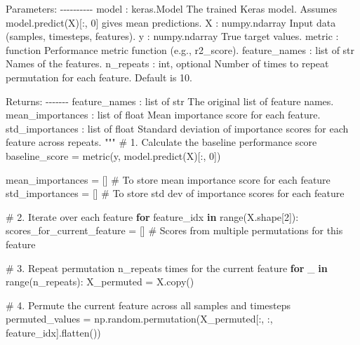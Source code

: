 \documentclass[
  letterpaper,
  DIV=11,
  numbers=noendperiod]{scrreprt}
\newenvironment{Shaded}{\begin{snugshade}}{\end{snugshade}}
\newcommand{\BuiltInTok}[1]{\textcolor[rgb]{0.00,0.23,0.31}{#1}}
\newcommand{\CommentTok}[1]{\textcolor[rgb]{0.37,0.37,0.37}{#1}}
\newcommand{\ControlFlowTok}[1]{\textcolor[rgb]{0.00,0.23,0.31}{\textbf{#1}}}
\newcommand{\DecValTok}[1]{\textcolor[rgb]{0.68,0.00,0.00}{#1}}
\newcommand{\KeywordTok}[1]{\textcolor[rgb]{0.00,0.23,0.31}{\textbf{#1}}}
\newcommand{\NormalTok}[1]{\textcolor[rgb]{0.00,0.23,0.31}{#1}}
\newcommand{\OperatorTok}[1]{\textcolor[rgb]{0.37,0.37,0.37}{#1}}
\begin{document}
\begin{Shaded}
\begin{Highlighting}[]
\CommentTok{    Parameters:}
\CommentTok{    {-}{-}{-}{-}{-}{-}{-}{-}{-}{-}}
\CommentTok{    model : keras.Model}
\CommentTok{        The trained Keras model. Assumes model.predict(X)[:, 0] gives mean predictions.}
\CommentTok{    X : numpy.ndarray}
\CommentTok{        Input data (samples, timesteps, features).}
\CommentTok{    y : numpy.ndarray}
\CommentTok{        True target values.}
\CommentTok{    metric : function}
\CommentTok{        Performance metric function (e.g., r2\_score).}
\CommentTok{    feature\_names : list of str}
\CommentTok{        Names of the features.}
\CommentTok{    n\_repeats : int, optional}
\CommentTok{        Number of times to repeat permutation for each feature. Default is 10.}

\CommentTok{    Returns:}
\CommentTok{    {-}{-}{-}{-}{-}{-}{-}}
\CommentTok{    feature\_names : list of str}
\CommentTok{        The original list of feature names.}
\CommentTok{    mean\_importances : list of float}
\CommentTok{        Mean importance score for each feature.}
\CommentTok{    std\_importances : list of float}
\CommentTok{        Standard deviation of importance scores for each feature across repeats.}
\CommentTok{    """}
    \CommentTok{\# 1. Calculate the baseline performance score}
\NormalTok{    baseline\_score }\OperatorTok{=}\NormalTok{ metric(y, model.predict(X)[:, }\DecValTok{0}\NormalTok{])}

\NormalTok{    mean\_importances }\OperatorTok{=}\NormalTok{ [] }\CommentTok{\# To store mean importance score for each feature}
\NormalTok{    std\_importances }\OperatorTok{=}\NormalTok{ []  }\CommentTok{\# To store std dev of importance scores for each feature}

    \CommentTok{\# 2. Iterate over each feature}
    \ControlFlowTok{for}\NormalTok{ feature\_idx }\KeywordTok{in} \BuiltInTok{range}\NormalTok{(X.shape[}\DecValTok{2}\NormalTok{]):}
\NormalTok{        scores\_for\_current\_feature }\OperatorTok{=}\NormalTok{ [] }\CommentTok{\# Scores from multiple permutations for this feature}

        \CommentTok{\# 3. Repeat permutation n\_repeats times for the current feature}
        \ControlFlowTok{for}\NormalTok{ \_ }\KeywordTok{in} \BuiltInTok{range}\NormalTok{(n\_repeats):}
\NormalTok{            X\_permuted }\OperatorTok{=}\NormalTok{ X.copy()}

            \CommentTok{\# 4. Permute the current feature across all samples and timesteps}
\NormalTok{            permuted\_values }\OperatorTok{=}\NormalTok{ np.random.permutation(X\_permuted[:, :, feature\_idx].flatten())}


\end{Highlighting}
\end{Shaded}
\end{document}
